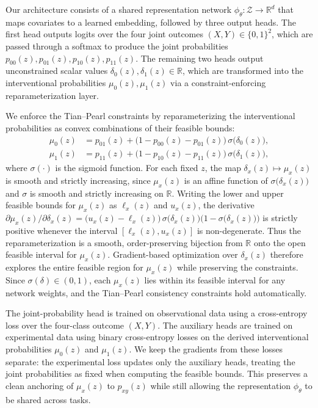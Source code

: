 \documentclass[accepted]{uai2026} %
\theoremstyle{plain}
\theoremstyle{definition}
\theoremstyle{remark}
\begin{document}
Our architecture consists of a shared representation network
$\phi_\theta : \mathcal{Z} \to \mathbb{R}^d$ that maps covariates to a learned
embedding, followed by three output heads.
The first head outputs logits over the four joint outcomes
$(X,Y) \in \{0,1\}^2$, which are passed through a softmax to produce the joint
probabilities $p_{00}(z), p_{01}(z), p_{10}(z), p_{11}(z)$.
The remaining two heads output unconstrained scalar values
$\delta_0(z), \delta_1(z) \in \mathbb{R}$, which are transformed into the
interventional probabilities $\mu_0(z), \mu_1(z)$ via a
constraint-enforcing reparameterization layer.

We enforce the Tian--Pearl constraints by reparameterizing the interventional
probabilities as convex combinations of their feasible bounds:
\begin{align}
\mu_0(z)
  &= p_{01}(z)
     + \bigl(1 - p_{00}(z) - p_{01}(z)\bigr)\,\sigma\bigl(\delta_0(z)\bigr),
  \\
\mu_1(z)
  &= p_{11}(z)
     + \bigl(1 - p_{10}(z) - p_{11}(z)\bigr)\,\sigma\bigl(\delta_1(z)\bigr),
\end{align}
where $\sigma(\cdot)$ is the sigmoid function.
For each fixed $z$, the map $\delta_x(z) \mapsto \mu_x(z)$ is smooth and
strictly increasing, since $\mu_x(z)$ is an affine function of
$\sigma\bigl(\delta_x(z)\bigr)$ and $\sigma$ is smooth and strictly increasing
on $\mathbb{R}$.
Writing the lower and upper feasible bounds for $\mu_x(z)$ as
$\ell_x(z)$ and $u_x(z)$, the derivative
$\partial \mu_x(z) / \partial \delta_x(z)
  = \bigl(u_x(z) - \ell_x(z)\bigr)\,
    \sigma\bigl(\delta_x(z)\bigr)\bigl(1 - \sigma\bigl(\delta_x(z)\bigr)\bigr)$
is strictly positive whenever the interval $[\ell_x(z), u_x(z)]$ is
non-degenerate.
Thus the reparameterization is a smooth, order-preserving bijection from
$\mathbb{R}$ onto the open feasible interval for $\mu_x(z)$.
Gradient-based optimization over $\delta_x(z)$ therefore explores the entire
feasible region for $\mu_x(z)$ while preserving the constraints.
Since $\sigma(\delta) \in (0,1)$, each $\mu_x(z)$ lies within its feasible
interval for any network weights, and the Tian--Pearl consistency constraints
hold automatically.

The joint-probability head is trained on observational data using a
cross-entropy loss over the four-class outcome $(X,Y)$.
The auxiliary heads are trained on experimental data using binary
cross-entropy losses on the derived interventional probabilities
$\mu_0(z)$ and $\mu_1(z)$.
We keep the gradients from these losses separate: the experimental loss
updates only the auxiliary heads, treating the joint probabilities as fixed
when computing the feasible bounds.
This preserves a clean anchoring of $\mu_x(z)$ to $p_{xy}(z)$ while still
allowing the representation $\phi_\theta$ to be shared across tasks.
\end{document}
